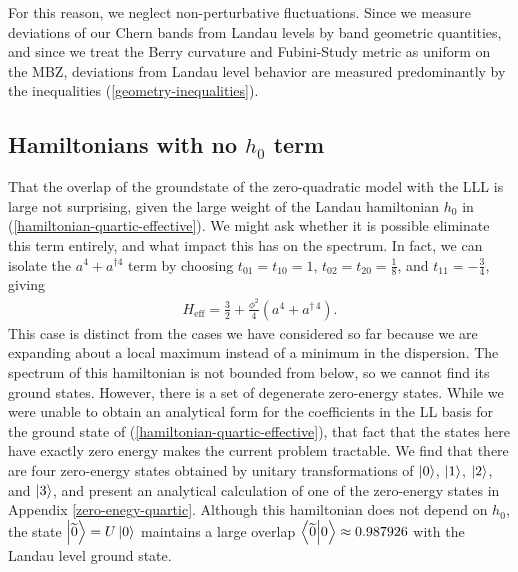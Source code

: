 \documentclass[aps,prb,twocolumn,letterpaper,twoside,nobalancelastpage,groupedaddress,amsmath,amssymb,floatfix,citeautoscript]{revtex4-1}
\begin{document}
For this reason, we neglect non-perturbative fluctuations. Since we measure deviations of our Chern bands from Landau levels by band geometric quantities, and since we treat the Berry curvature and Fubini-Study metric as uniform on the MBZ, deviations from Landau level behavior are measured predominantly by the inequalities (\ref{geometry-inequalities}).

\subsection{Hamiltonians with no $h_0$ term}
That the overlap of the groundstate of the zero-quadratic model with the LLL is large not surprising, given the large weight of the Landau hamiltonian $h_0$ in (\ref{hamiltonian-quartic-effective}). We might ask whether it is possible eliminate this term entirely, and what impact this has on the spectrum. In fact, we can isolate the $a^4 + a^{\dag 4}$ term by choosing $t_{01} = t_{10} = 1$, $t_{02} = t_{20} = \frac{1}{8}$, and $t_{11} = - \frac{3}{4}$, giving
\begin{align*}
H_{\text{eff}} = \frac{3}{2} + \frac{\phi^2}{4}(a^4 + a^{\dag\,4}).
\end{align*}
This case is distinct from the cases we have considered so far because we are expanding about a local maximum instead of a minimum in the dispersion. The spectrum of this hamiltonian is not bounded from below, so we cannot find its ground states. However, there is a set of degenerate zero-energy states. While we were unable to obtain an analytical form for the coefficients in the LL basis for the ground state of (\ref{hamiltonian-quartic-effective}), that fact that the states here have exactly zero energy makes the current problem tractable. We find that there are four zero-energy states obtained by unitary transformations of $\ket{0}$, $\ket{1}$, $\ket{2}$, and $\ket{3}$, and present an analytical calculation of one of the zero-energy states in Appendix \ref{zero-enegy-quartic}. Although this hamiltonian does not depend on $h_0$, the state $\ket{\widetilde{0}} = U\ket{0}$ maintains a large overlap $\braket{\widetilde{0}}{0} \approx 0.987926$ with the Landau level ground state.
\end{document}
